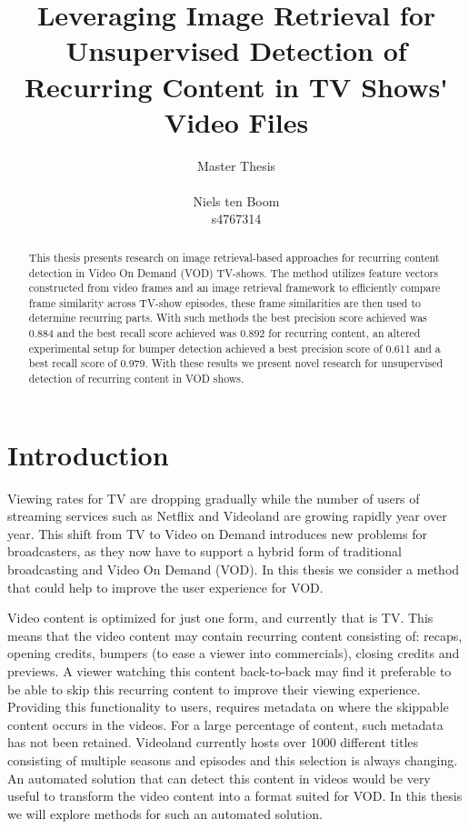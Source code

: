 \documentclass{article}
\begin{document}
\title{Leveraging Image Retrieval for Unsupervised Detection of Recurring Content in TV Shows\'{} Video Files}
\author{Master Thesis\\ \\ Niels ten Boom  \\ s4767314}

\date{\vspace{-3ex}}

\maketitle
\newpage

\begin{abstract}
This thesis presents research on image retrieval-based approaches for recurring content detection in Video On Demand (VOD) TV-shows. The method utilizes feature vectors constructed from video frames and an image retrieval framework to efficiently compare frame similarity across TV-show episodes, these frame similarities are then used to determine recurring parts. With such methods the best precision score achieved was 0.884 and the best recall score achieved was 0.892 for recurring content, an altered experimental setup for bumper detection achieved a best precision score of 0.611 and a best recall score of 0.979. With these results we present novel research for unsupervised detection of recurring content in VOD shows.
\end{abstract}
\newpage

\tableofcontents
\newpage

\section{Introduction} \label{introduction}
Viewing rates for TV are dropping gradually while the number of users of streaming services such as Netflix and Videoland are growing rapidly year over year. This shift from TV to Video on Demand introduces new problems for broadcasters, as they now have to support a hybrid form of traditional broadcasting and Video On Demand (VOD). In this thesis we consider a method that could help to improve the user experience for VOD.

Video content is optimized for just one form, and currently that is TV. This means that the video content may contain recurring content consisting of: recaps, opening credits, bumpers (to ease a viewer into commercials), closing credits and previews. A viewer watching this content back-to-back may find it preferable to be able to skip this recurring content to improve their viewing experience. Providing this functionality to users, requires metadata on where the skippable content occurs in the videos. For a large percentage of content, such metadata has not been retained. Videoland currently hosts over 1000 different titles consisting of multiple seasons and episodes and this selection is always changing. An automated solution that can detect this content in videos would be very useful to transform the video content into a format suited for VOD. In this thesis we will explore methods for such an automated solution.
\end{document}
